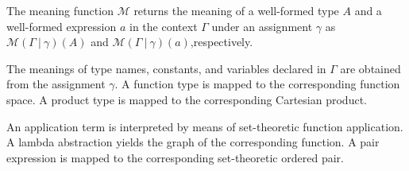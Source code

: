 \documentclass [12pt,twoside]{cslreport}
\newcommand{\tupletype}[1]{[#1]}
\newcommand{\twob}{\mathbf{2}}
\newcommand{\oneb}{\mathbf{1}}
\newcommand{\zerob}{\mathbf{0}}
\newcommand{\reals}{\mathbf{R}}
\newcommand{\ttbool}{\mathtt{bool}}
\newcommand{\vbar}{\ |\ }
\begin{document}
The  meaning function $\mathcal{M}$ returns the meaning of
a well-formed type $A$  
and a well-formed expression $a$ in the context $\Gamma$ under an
assignment $\gamma$ as $\mathcal{M}(\Gamma\vbar \gamma)(A)$ 
and 
$\mathcal{M}(\Gamma\vbar \gamma)(a)$,respectively. 
\begin{comment}
The base types 
\texttt{bool} and \texttt{real} are mapped to $\twob$ and $\reals$,
respectively.
\end{comment}

The meanings of type names, constants, and variables
declared in $\Gamma$ are obtained from the assignment $\gamma$\@.  A
function type is mapped to the 
corresponding function space.  A product type is mapped to the corresponding
Cartesian product.
\begin{comment}
an $n$-tuple is represented by an $(n+1)$-fold
Cartesian product terminated by the sole element $\zerob$ of the set \oneb\@.
This representation  distinguishes a 3-tuple
$\tupletype{\ttbool, \ttbool, \ttbool}$ from the 
2-tuple $\tupletype{\ttbool, \tupletype{\ttbool, \ttbool}}$\@.
\end{comment}
An application term is interpreted by 
means of set-theoretic function application.  A lambda abstraction yields the
graph of the corresponding function.  A pair expression is mapped
to the corresponding set-theoretic ordered pair.    
\end{document}
